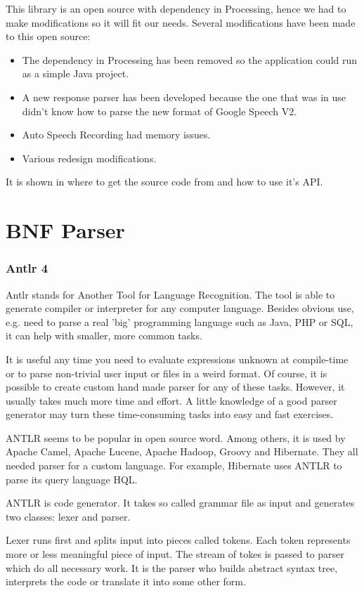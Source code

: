 This library is an open source with dependency in Processing, hence we had to make modifications so it will fit our needs. Several modifications have been made to this open source:
\begin{itemize}
	\item The dependency in Processing has been removed so the application could run as a simple Java project. 
	\item A new response parser has been developed because the one that was in use didn't know how to parse the new format of Google Speech V2.
	\item Auto Speech Recording had memory issues.
	\item Various redesign modifications.
\end{itemize}
It is shown in \citet{getflourish14} where to get the source code from and how to use it's API.
\section{BNF Parser} \label{section:BNF Parser}
\subsubsection{Antlr 4}
Antlr stands for Another Tool for Language Recognition. The tool is able to generate compiler or interpreter for any computer language. Besides obvious use, e.g. need to parse a real 'big' programming language such as Java, PHP or SQL, it can help with smaller, more common tasks.

It is useful any time you need to evaluate expressions unknown at compile-time or to parse non-trivial user input or files in a weird format. Of course, it is possible to create custom hand made parser for any of these tasks. However, it usually takes much more time and effort. A little knowledge of a good parser generator may turn these time-consuming tasks into easy and fast exercises.

ANTLR seems to be popular in open source word. Among others, it is used by Apache Camel, Apache Lucene, Apache Hadoop, Groovy and Hibernate. They all needed parser for a custom language. For example, Hibernate uses ANTLR to parse its query language HQL.

ANTLR is code generator. It takes so called grammar file as input and generates two classes: lexer and parser.

Lexer runs first and splits input into pieces called tokens. Each token represents more or less meaningful piece of input. The stream of tokes is passed to parser which do all necessary work. It is the parser who builds abstract syntax tree, interprets the code or translate it into some other form.

